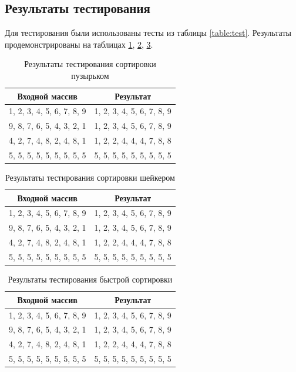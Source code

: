 \documentclass[a4paper,12pt]{article}
\begin{document}
\subsection{Результаты тестирования}

Для тестирования были использованы тесты из таблицы \ref{table:test}.
Результаты продемонстрированы на таблицах \ref{table:bubble}, \ref{table:shaker},
\ref{table:qsort}.

\begin{table}[H]
    \centering
    \caption{Результаты тестирования сортировки пузырьком}
    \label{table:bubble}
    \begin{tabular}{|c|c|}
        \hline
        Входной массив & Результат \\
        \hline
        1, 2, 3, 4, 5, 6, 7, 8, 9 & 1, 2, 3, 4, 5, 6, 7, 8, 9 \\
        \hline
        9, 8, 7, 6, 5, 4, 3, 2, 1 & 1, 2, 3, 4, 5, 6, 7, 8, 9 \\
        \hline
        4, 2, 7, 4, 8, 2, 4, 8, 1 & 1, 2, 2, 4, 4, 4, 7, 8, 8 \\
        \hline
        5, 5, 5, 5, 5, 5, 5, 5, 5 & 5, 5, 5, 5, 5, 5, 5, 5, 5 \\
        \hline
    \end{tabular}
\end{table}

\begin{table}[H]
    \centering
    \caption{Результаты тестирования сортировки шейкером}
    \label{table:shaker}
    \begin{tabular}{|c|c|}
        \hline
        Входной массив & Результат \\
        \hline
        1, 2, 3, 4, 5, 6, 7, 8, 9 & 1, 2, 3, 4, 5, 6, 7, 8, 9 \\
        \hline
        9, 8, 7, 6, 5, 4, 3, 2, 1 & 1, 2, 3, 4, 5, 6, 7, 8, 9 \\
        \hline
        4, 2, 7, 4, 8, 2, 4, 8, 1 & 1, 2, 2, 4, 4, 4, 7, 8, 8 \\
        \hline
        5, 5, 5, 5, 5, 5, 5, 5, 5 & 5, 5, 5, 5, 5, 5, 5, 5, 5 \\
        \hline
    \end{tabular}
\end{table}

\begin{table}[H]
    \centering
    \caption{Результаты тестирования быстрой сортировки}
    \label{table:qsort}
    \begin{tabular}{|c|c|}
        \hline
        Входной массив & Результат \\
        \hline
        1, 2, 3, 4, 5, 6, 7, 8, 9 & 1, 2, 3, 4, 5, 6, 7, 8, 9 \\
        \hline
        9, 8, 7, 6, 5, 4, 3, 2, 1 & 1, 2, 3, 4, 5, 6, 7, 8, 9 \\
        \hline
        4, 2, 7, 4, 8, 2, 4, 8, 1 & 1, 2, 2, 4, 4, 4, 7, 8, 8 \\
        \hline
        5, 5, 5, 5, 5, 5, 5, 5, 5 & 5, 5, 5, 5, 5, 5, 5, 5, 5 \\
        \hline
    \end{tabular}
\end{table}
\end{document}
